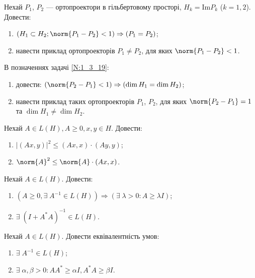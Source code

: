\begin{exercise}\label{N:1_3_19}
    Нехай $P_1$, $P_2$ --- ортопроектори в гільбертовому просторі, $H_k = \mathrm{Im} P_k$ ($k = 1, 2$). Довести:
    \begin{enumerate}[label=\ukr*)]
        \item $(H_1 \subset H_2; \norm{P_1 - P_2} < 1) \Rightarrow (P_1 = P_2)$;
        \item навести приклад ортопроекторів $P_1 \neq P_2$, для яких $\norm{P_1 - P_2} < 1$.
    \end{enumerate}
\end{exercise}

\begin{exercise}
    В позначеннях задачі \ref{N:1_3_19}:
    \begin{enumerate}[label=\ukr*)]
        \item довести: $(\norm{P_2 - P_1} < 1) \Rightarrow (\dim H_1 = \dim H_2)$;
        \item навести приклад таких ортопроекторів $P_1$, $P_2$, для яких $\norm{P_2 - P_1} = 1$ та $\dim H_1 \neq \dim H_2$.
    \end{enumerate}
\end{exercise}

\begin{exercise}
    Нехай $A \in L(H), A \geq 0, x, y \in H$. Довести:
    \begin{enumerate}[label=\ukr*)]
        \item $|(Ax, y)|^2 \leq (Ax, x) \cdot (Ay, y)$;
        \item $\norm{A}^2 \leq \norm{A} \cdot (Ax, x)$.
    \end{enumerate}
\end{exercise}

\begin{exercise}
    Нехай $A \in L(H)$. Довести:
    \begin{enumerate}[label=\ukr*)]
        \item $(A \geq 0, \exists \; A^{-1} \in L(H)) \Rightarrow (\exists \; \lambda > 0 : A \geq \lambda I)$;
        \item $\exists \; (I + A^* A)^{-1} \in L(H)$.
    \end{enumerate}
\end{exercise}

\begin{exercise}
    Нехай $A \in L(H)$. Довести еквівалентність умов:
    \begin{enumerate}[label=\ukr*)]
        \item $\exists \; A^{-1} \in L(H)$;
        \item $\exists \; \alpha, \beta > 0 : A A^{*} \geq \alpha I, A^{*} A \geq \beta I$.
    \end{enumerate}
\end{exercise}